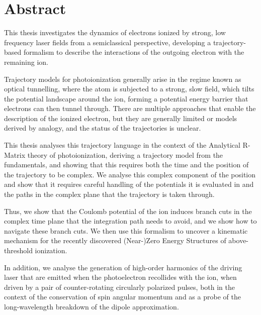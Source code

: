 






\chapter*{Abstract}

\newlength{\abstskip}
\setlength{\abstskip}{8pt}

This thesis investigates the dynamics of electrons ionized by strong, low frequency laser fields from a semiclassical perspective, developing a trajectory-based formalism to describe the interactions of the outgoing electron with the remaining ion.

\vspace{\abstskip}
\noindent
Trajectory models for photoionization generally arise in the regime known as optical tunnelling, where the atom is subjected to a strong, slow field, which tilts the potential landscape around the ion, forming a potential energy barrier that electrons can then tunnel through. There are multiple approaches that enable the description of the ionized electron, but they are generally limited or models derived by analogy, and the status of the trajectories is unclear.

\vspace{\abstskip}
\noindent
This thesis analyses this trajectory language in the context of the Analytical R-Matrix theory of photoionization, deriving a trajectory model from the fundamentals, and showing that this requires both the time and the position of the trajectory to be complex. We analyse this complex component of the position and show that it requires careful handling of the potentials it is evaluated in and the paths in the complex plane that the trajectory is taken through.

\vspace{\abstskip}
\noindent
Thus, we show that the Coulomb potential of the ion induces branch cuts in the complex time plane that the integration path needs to avoid, and we show how to navigate these branch cuts. We then use this formalism to uncover a kinematic mechanism for the recently discovered (Near-)Zero Energy Structures of above-threshold ionization.

\vspace{\abstskip}
\noindent
In addition, we analyse the generation of high-order harmonics of the driving laser that are emitted when the photoelectron recollides with the ion, when driven by a pair of counter-rotating circularly polarized pulses, both in the context of the conservation of spin angular momentum and as a probe of the long-wavelength breakdown of the dipole approximation.











